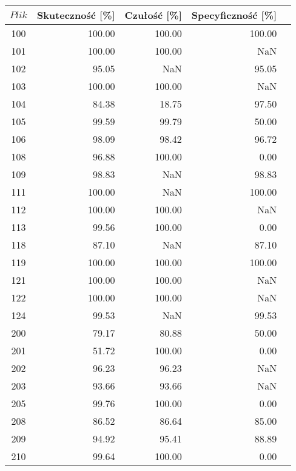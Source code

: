 \begin{table}
	\centering
	\begin{tabular}{|c|r|r|r|r|}
		\hline
		$Plik$ & Skuteczność [\%] & Czułość [\%] & Specyficzność [\%] \\
		\hline
		100 & 100.00     & 100.00     & 100.00     \\
		\hline
		101 & 100.00     & 100.00     & NaN        \\
		\hline
		102 & 95.05      & NaN        & 95.05      \\
		\hline
		103 & 100.00     & 100.00     & NaN        \\
		\hline
		104 & 84.38      & 18.75      & 97.50      \\
		\hline
		105 & 99.59      & 99.79      & 50.00      \\
		\hline
		106 & 98.09      & 98.42      & 96.72      \\
		\hline
		108 & 96.88      & 100.00     & 0.00       \\
		\hline
		109 & 98.83      & NaN        & 98.83      \\
		\hline
		111 & 100.00     & NaN        & 100.00     \\
		\hline
		112 & 100.00     & 100.00     & NaN        \\
		\hline
		113 & 99.56      & 100.00     & 0.00       \\
		\hline
		118 & 87.10      & NaN        & 87.10      \\
		\hline
		119 & 100.00     & 100.00     & 100.00     \\
		\hline
		121 & 100.00     & 100.00     & NaN        \\
		\hline
		122 & 100.00     & 100.00     & NaN        \\
		\hline
		124 & 99.53      & NaN        & 99.53      \\
		\hline
		200 & 79.17      & 80.88      & 50.00      \\
		\hline
		201 & 51.72      & 100.00     & 0.00       \\
		\hline
		202 & 96.23      & 96.23      & NaN        \\
		\hline
		203 & 93.66      & 93.66      & NaN        \\
		\hline
		205 & 99.76      & 100.00     & 0.00       \\
		\hline
		208 & 86.52      & 86.64      & 85.00      \\
		\hline
		209 & 94.92      & 95.41      & 88.89      \\
		\hline
		210 & 99.64      & 100.00     & 0.00       \\

\end{tabular}
\end{table}

